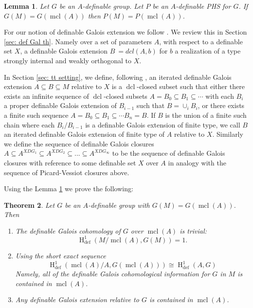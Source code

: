 \documentclass{amsart}
\newtheorem{theorem}{Theorem}[section]
\newtheorem{lemma}[theorem]{Lemma}
\theoremstyle{definition}
\theoremstyle{remark}
\numberwithin{equation}{section}
\def \defin {\operatorname{def}}
\def \HH {\operatorname{H}}
\def \mcl {\operatorname{mcl}}
\def \dcl {\operatorname{dcl}}
\begin{document}
\begin{lemma}\label{lem: mcl points}
    Let $G$ be an $A$-definable group. Let $P$ be an $A$-definable PHS for $G$. If $G(M) = G(\mcl(A))$ then $P(M) = P(\mcl(A))$. 
\end{lemma} 

For our notion of definable Galois extension we follow \cite{OmarAnand}. We review this in Section \ref{sec: def Gal th}. Namely over a set of parameters $A$, with respect to a definable set $X$, a definable Galois extension $B\ = dcl(A,b)$ for $b$ a realization of a type strongly internal and weakly orthogonal to $X$. 

In Section \ref{sec: tt setting}, we define, following \cite{meretzky2026galoistheoryautomorphismgroups}, an iterated definable Galois extension $A \subseteq B \subseteq M$ relative to $X$ is a $\dcl$-closed subset such that either there exists an infinite sequence of $\dcl$-closed subsets $A=B_0 \subseteq B_1 \subseteq \cdots $ with each $B_i$ a proper definable Galois extension of $B_{i-1}$ such that $B= \cup_iB_i$, or there exists a finite such sequence $A=B_0 \subseteq B_1 \subseteq \cdots B_n=B$. If $B$ is the union of a finite such chain where each $B_i/B_{i-1}$ is a definable Galois extension of finite type, we call $B$ an iterated definable Galois extension of finite type of $A$ relative to $X$. Similarly we define the sequence of definable Galois closures $A \subseteq A^{XDG_1} \subseteq A^{XDG_2} \subseteq ... \subseteq A^{XDG_\infty}$ to be the sequence of definable Galois closures with reference to some definable set $X$ over $A$ in analogy with the sequence of Picard-Vessiot closures above. 

Using the Lemma \ref{lem: mcl points} we prove the following: 

\begin{theorem}\label{thm: mcl points}
    Let $G$ be an $A$-definable group with $G(M) = G(\mcl(A))$. Then
    \begin{enumerate}
        \item The definable Galois cohomology of $G$ over $\mcl(A)$ is trivial: $$\HH^1_{\defin}(M/\mcl(A),G(M)) = 1.$$
        \item Using the short exact sequence $$\HH^1_{\defin}(\mcl(A)/A,G(\mcl(A))) \cong \HH^1_{\defin}(A,G)$$ Namely, all of the definable Galois cohomological information for $G$ in $M$ is contained in $\mcl(A)$.
        \item Any definable Galois extension relative to $G$ is contained in $\mcl(A)$.
    \end{enumerate}
\end{theorem}
\end{document}
